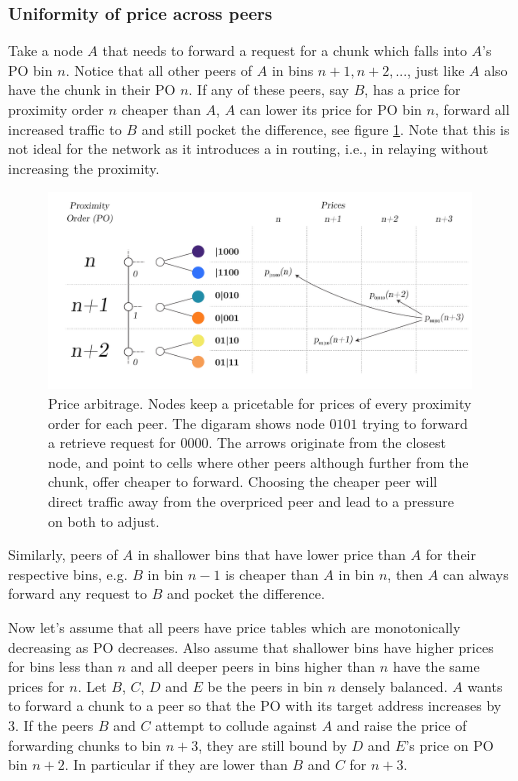 \subsubsection{Uniformity of price across peers}

Take a node $A$ that needs to forward a request for a chunk which falls into $A$'s PO bin $n$. Notice that all other peers of $A$ in bins $n+1, n+2, ...$, just like $A$ also have the chunk in their PO $n$. If any of these peers, say $B$, has a price  for proximity order $n$ cheaper than $A$, $A$ can lower its price for PO bin $n$, forward all increased traffic to $B$ and still pocket the difference, see figure  \ref{fig:price-arbitrage}. Note that this is not ideal for the network as it introduces a  in routing, i.e., in relaying without increasing the proximity. 


\begin{figure}[htbp]
   \centering
   \includegraphics[width=\textwidth]{fig/price-arbitrage-3.pdf}
    \caption[Price arbitrage \statusgreen]{Price arbitrage. Nodes keep a pricetable for prices of every proximity order for each peer. The digaram shows node $0101$ trying to forward a retrieve request for $0000$. The arrows originate from the closest node, and point to cells where other peers although further from the chunk, offer cheaper to forward. Choosing the cheaper peer will direct traffic away from the overpriced peer and lead to a pressure on both to adjust.}
   \label{fig:price-arbitrage}
\end{figure}
 


Similarly, peers of $A$ in shallower bins that have lower price than $A$ for their respective bins, e.g. $B$ in bin $n-1$ is cheaper than $A$ in bin $n$, then $A$ can always forward any request to $B$ and pocket the difference.

Now let's assume that all peers have price tables which are monotonically decreasing as PO decreases. Also assume that shallower bins have higher prices for bins less than $n$ and all deeper peers in bins higher than $n$ have the same prices for $n$. Let $B$, $C$, $D$ and $E$ be the peers in bin $n$ densely balanced. $A$ wants to  forward a chunk to a peer so that the PO with its target address increases by 3. If the peers $B$ and $C$ attempt to collude against $A$ and raise the price of forwarding chunks to bin $n+3$, they are still bound by $D$ and $E$'s price on PO bin $n+2$. In particular if they are lower than $B$ and $C$ for $n+3$.


